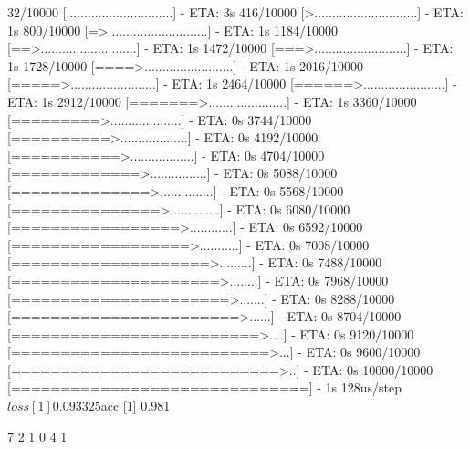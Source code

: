 \documentclass[12pt,]{krantz}
\makeatletter
\newenvironment{Shaded}{\begin{snugshade}}{\end{snugshade}}
\newcommand{\KeywordTok}[1]{\textcolor[rgb]{0.27,0.27,0.27}{\textbf{#1}}}
\newcommand{\NormalTok}[1]{#1}
\newcommand{\OperatorTok}[1]{\textcolor[rgb]{0.43,0.43,0.43}{\textbf{#1}}}
\newcommand{\StringTok}[1]{\textcolor[rgb]{0.5,0.5,0.5}{#1}}
\newenvironment{kframe}{%
\medskip{}
\setlength{\fboxsep}{.8em}
 \def\at@end@of@kframe{}%
 \ifinner\ifhmode%
  \def\at@end@of@kframe{\end{minipage}}%
  \begin{minipage}{\columnwidth}%
 \fi\fi%
 \def\FrameCommand##1{\hskip\@totalleftmargin \hskip-\fboxsep
 \colorbox{shadecolor}{##1}\hskip-\fboxsep
     \hskip-\linewidth \hskip-\@totalleftmargin \hskip\columnwidth}%
 \MakeFramed {\advance\hsize-\width
   \@totalleftmargin\z@ \linewidth\hsize
   \@setminipage}}%
 {\par\unskip\endMakeFramed%
 \at@end@of@kframe}
\renewenvironment{Shaded}{\begin{kframe}}{\end{kframe}}
\makeatother
\begin{document}
\begin{Shaded}
\begin{Highlighting}[]
\NormalTok{   32/10000 [..............................] - ETA: 3s}
\NormalTok{  416/10000 [>.............................] - ETA: 1s}
\NormalTok{  800/10000 [=>............................] - ETA: 1s}
\NormalTok{ 1184/10000 [==>...........................] - ETA: 1s}
\NormalTok{ 1472/10000 [===>..........................] - ETA: 1s}
\NormalTok{ 1728/10000 [====>.........................] - ETA: 1s}
\NormalTok{ 2016/10000 [=====>........................] - ETA: 1s}
\NormalTok{ 2464/10000 [======>.......................] - ETA: 1s}
\NormalTok{ 2912/10000 [=======>......................] - ETA: 1s}
\NormalTok{ 3360/10000 [=========>....................] - ETA: 0s}
\NormalTok{ 3744/10000 [==========>...................] - ETA: 0s}
\NormalTok{ 4192/10000 [===========>..................] - ETA: 0s}
\NormalTok{ 4704/10000 [=============>................] - ETA: 0s}
\NormalTok{ 5088/10000 [==============>...............] - ETA: 0s}
\NormalTok{ 5568/10000 [===============>..............] - ETA: 0s}
\NormalTok{ 6080/10000 [=================>............] - ETA: 0s}
\NormalTok{ 6592/10000 [==================>...........] - ETA: 0s}
\NormalTok{ 7008/10000 [====================>.........] - ETA: 0s}
\NormalTok{ 7488/10000 [=====================>........] - ETA: 0s}
\NormalTok{ 7968/10000 [======================>.......] - ETA: 0s}
\NormalTok{ 8288/10000 [=======================>......] - ETA: 0s}
\NormalTok{ 8704/10000 [=========================>....] - ETA: 0s}
\NormalTok{ 9120/10000 [==========================>...] - ETA: 0s}
\NormalTok{ 9600/10000 [===========================>..] - ETA: 0s}
\NormalTok{10000/10000 [==============================] - 1s 128us/step}
\NormalTok{$loss}
\NormalTok{[1] 0.093325}

\NormalTok{$acc}
\NormalTok{[1] 0.981}
\end{Highlighting}
\end{Shaded}

\begin{Shaded}
\end{Shaded}

\begin{Shaded}
\begin{Highlighting}[]
\NormalTok{ [1] 7 2 1 0 4 1}
\end{Highlighting}
\end{Shaded}
\end{document}
